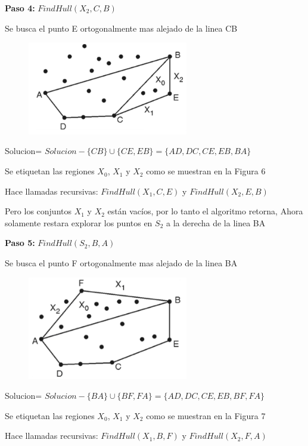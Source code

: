 \begin{enumerate}[a)]
\textbf{Paso 4: }$FindHull(X_2, C, B)$

Se busca el punto E ortogonalmente mas alejado de la linea CB

\begin{figure}[!htb]
  \centering
  \includegraphics[width=7cm, scale=1]{Images/Punto3/ej5.png}
  \caption{}
\end{figure}

Solucion= $Solucion - \{CB\} \cup \{CE,EB\} = \{AD, DC, CE, EB, BA\}$

Se etiquetan las regiones $X_0$, $X_1$ y $X_2$ como se muestran en la Figura 6

Hace llamadas recursivas: $FindHull(X_1, C, E)$ y $FindHull(X_2, E, B)$

Pero los conjuntos $X_1$ y $X_2$ están vacíos, por lo tanto el algoritmo retorna, Ahora solamente restara explorar los puntos en $S_2$ a la derecha de la linea BA

\textbf{Paso 5: }$FindHull(S_2, B, A)$

Se busca el punto F ortogonalmente mas alejado de la linea BA

\begin{figure}[!htb]
  \centering
  \includegraphics[width=7cm, scale=1]{Images/Punto3/ej6.png}
  \caption{}
\end{figure}

Solucion= $Solucion - \{BA\} \cup \{BF,FA\} = \{AD, DC, CE, EB, BF, FA\}$

Se etiquetan las regiones $X_0$, $X_1$ y $X_2$ como se muestran en la Figura 7

Hace llamadas recursivas: $FindHull(X_1, B, F)$ y $FindHull(X_2, F, A)$


\end{enumerate}
